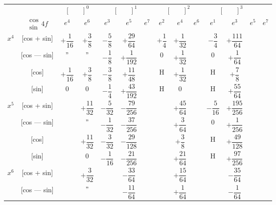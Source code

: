 \documentclass[11pt,a4paper]{book}
\begin{document}
{{%
\newpage
{}

\begin{center}
\small
\begin{tabular}{|c|c|c|c|c|c|c|c|c|c|c|c|}
\hline
& &  &  &  &  \\
& $\begin{smallmatrix} \cos \\ \sin \end{smallmatrix} 4f$ & $e^4$ & $e^6$ & $e^3$ & $e^5$ & $e^7$ & $e^2$ & $e^4$ & $e^6$ & $e^1$ & $e^3$ & $e^5$ & $e^7$ \\
\hline
{} & [cos + sin] & $+\dfrac{1}{16}$ & $+\dfrac{3}{8}$ & $-\dfrac{5}{8}$ & $+\dfrac{29}{64}$ & & $+\dfrac{1}{4}$ & $+\dfrac{1}{32}$ & & $-\dfrac{3}{4}$ & $+\dfrac{111}{64}$ \\
& [cos --- sin] & $"$ & $"$ & $-\dfrac{1}{8}$ & $+\dfrac{1}{192}$ & & $0$ & $+\dfrac{1}{32}$ & & $0$ & $+\dfrac{1}{64}$ \\
& [cos] & $+\dfrac{1}{16}$ & $+\dfrac{3}{8}$ & $-\dfrac{3}{8}$ & $+\dfrac{11}{48}$ & & H & $+\dfrac{1}{32}$ & & H & $+\dfrac{7}{8}$ \\
& [sin] & $0$ & $0$ & $-\dfrac{1}{4}$ & $+\dfrac{43}{192}$ & & H & $0$ & & H & $+\dfrac{55}{64}$ \\
\hline
{} & [cos + sin] & & $+\dfrac{11}{32}$ & $-\dfrac{5}{32}$ & $-\dfrac{79}{256}$ & & & $+\dfrac{45}{64}$ & & $-\dfrac{5}{16}$ & $+\dfrac{195}{256}$ \\
& [cos --- sin] & & $"$ & $-\dfrac{1}{32}$ & $-\dfrac{37}{256}$ & & & $+\dfrac{3}{64}$ & & $0$ & $+\dfrac{1}{256}$ \\
& [cos] & & $+\dfrac{11}{32}$ & $-\dfrac{3}{32}$ & $-\dfrac{29}{128}$ & & & $+\dfrac{3}{8}$ & & H & $+\dfrac{49}{128}$ \\
& [sin] & & $0$ & $-\dfrac{1}{16}$ & $-\dfrac{21}{256}$ & & & $+\dfrac{21}{64}$ & & H & $+\dfrac{97}{256}$ \\
\hline
{} & [cos + sin] & & $+\dfrac{3}{32}$ & & $-\dfrac{33}{64}$ & & & $+\dfrac{15}{64}$ & & & $-\dfrac{35}{64}$ \\
& [cos --- sin] & & $"$ & & $-\dfrac{11}{64}$ & & & $+\dfrac{1}{64}$ & & & $-\dfrac{1}{64}$ \\

\end{tabular}
\end{center}}}
\end{document}
